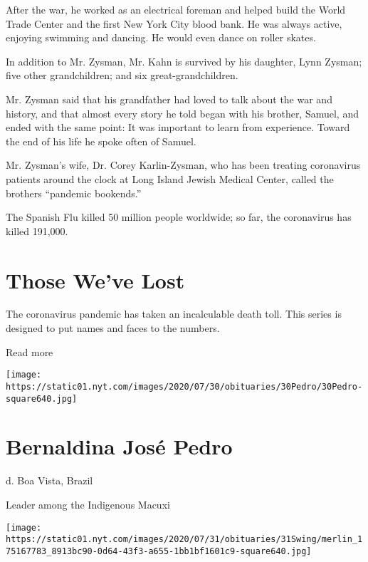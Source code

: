 After the war, he worked as an electrical foreman and helped build the
World Trade Center and the first New York City blood bank. He was always
active, enjoying swimming and dancing. He would even dance on roller
skates.

In addition to Mr. Zysman, Mr. Kahn is survived by his daughter, Lynn
Zysman; five other grandchildren; and six great-grandchildren.

Mr. Zysman said that his grandfather had loved to talk about the war and
history, and that almost every story he told began with his brother,
Samuel, and ended with the same point: It was important to learn from
experience. Toward the end of his life he spoke often of Samuel.

Mr. Zysman's wife, Dr. Corey Karlin-Zysman, who has been treating
coronavirus patients around the clock at Long Island Jewish Medical
Center, called the brothers ``pandemic bookends.''

The Spanish Flu killed 50 million people worldwide; so far, the
coronavirus has killed 191,000.

\href{https://www.nytimes.com/interactive/2020/obituaries/people-died-coronavirus-obituaries.html?action=click\&pgtype=Article\&state=default\&region=BELOW_MAIN_CONTENT\&context=covid_obits_promo}{}

\hypertarget{those-weve-lost}{%
\section{Those We've Lost}\label{those-weve-lost}}

The coronavirus pandemic has taken an incalculable death toll. This
series is designed to put names and faces to the numbers.

Read more

\texttt{[image: https://static01.nyt.com/images/2020/07/30/obituaries/30Pedro/30Pedro-square640.jpg]}

\hypertarget{bernaldina-josuxe9-pedro}{%
\section{Bernaldina José Pedro}\label{bernaldina-josuxe9-pedro}}

d. Boa Vista, Brazil

Leader among the Indigenous Macuxi

\texttt{[image: https://static01.nyt.com/images/2020/07/31/obituaries/31Swing/merlin\_175167783\_8913bc90-0d64-43f3-a655-1bb1bf1601c9-square640.jpg]}

